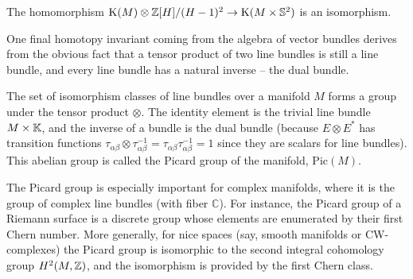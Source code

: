 \begin{thm}
    The homomorphism $\mathrm{K}(M)\otimes \mathbb{Z}[H]\slash(H-1)^2\to \mathrm{K}(M\times\mathbb{S}^2)$ is an isomorphism.
\end{thm}


One final homotopy invariant coming from the algebra of vector bundles derives from the obvious fact that a tensor product of two line bundles is still a line bundle, and every line bundle has a natural inverse -- the dual bundle.

\begin{defn}
    The set of isomorphism classes of line bundles over a manifold $M$ forms a group under the tensor product $\otimes$. The identity element is the trivial line bundle $M\times\mathbb{K} $, and the inverse of a bundle is the dual bundle (because $E\otimes E^\ast$ has transition functions $\tau_{\alpha\beta}\otimes \tau_{\alpha\beta}^{-1}=\tau_{\alpha\beta} \tau_{\alpha\beta}^{-1}=1$ since they are scalars for line bundles).
    This abelian group is called the Picard group of the manifold, $\mathrm{Pic}(M)$.
\end{defn}
\begin{rem}
    The Picard group is especially important for complex manifolds, where it is the group of complex line bundles (with fiber $\mathbb{C}$). For instance, the Picard group of a Riemann surface is a discrete group whose elements are enumerated by their first Chern number. More generally, for nice spaces (say, smooth manifolds or CW-complexes) the Picard group is isomorphic to the second integral cohomology group $H^2(M,\mathbb{Z})$, and the isomorphism is provided by the first Chern class.
\end{rem}

